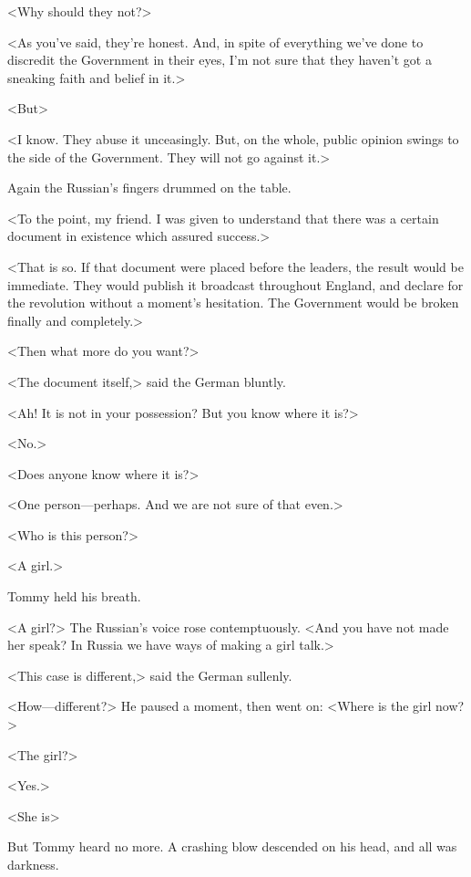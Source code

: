 <Why should they not?>

<As you've said, they're honest. And, in spite of everything we've done to discredit the Government in their eyes, I'm not sure that they haven't got a sneaking faith and belief in it.>

<But\longdash>

<I know. They abuse it unceasingly. But, on the whole, public opinion swings to the side of the Government. They will not go against it.>

Again the Russian's fingers drummed on the table.

<To the point, my friend. I was given to understand that there was a certain document in existence which assured success.>

<That is so. If that document were placed before the leaders, the result would be immediate. They would publish it broadcast throughout England, and declare for the revolution without a moment's hesitation. The Government would be broken finally and completely.>

<Then what more do you want?>

<The document itself,> said the German bluntly.

<Ah! It is not in your possession? But you know where it is?>

<No.>

<Does anyone know where it is?>

<One person—perhaps. And we are not sure of that even.>

<Who is this person?>

<A girl.>

Tommy held his breath.

<A girl?> The Russian's voice rose contemptuously. <And you have not made her speak? In Russia we have ways of making a girl talk.>

<This case is different,> said the German sullenly.

<How—different?> He paused a moment, then went on: <Where is the girl now?>

<The girl?>

<Yes.>

<She is\longdash>

But Tommy heard no more. A crashing blow descended on his head, and all was darkness. 